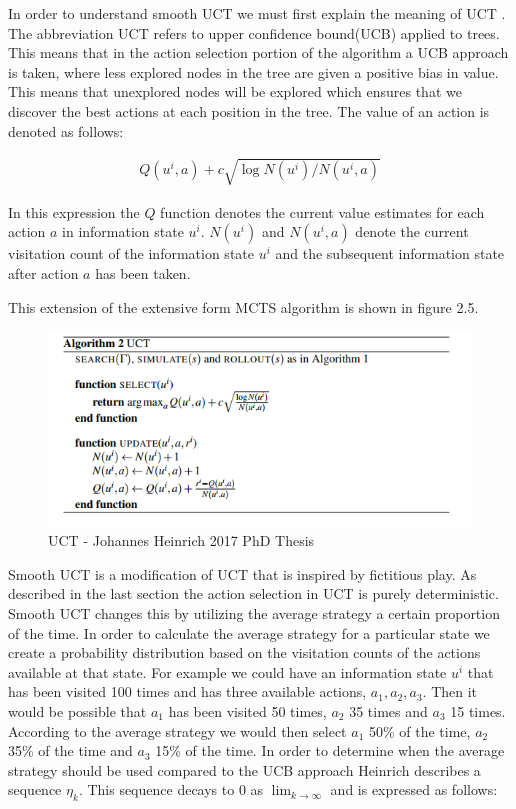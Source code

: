 In order to understand smooth UCT we must first explain the meaning of UCT .
The abbreviation UCT refers to upper confidence bound(UCB) applied to trees.
This means that in the action selection portion of the algorithm a UCB approach 
is taken, where less explored nodes in the tree are given a positive bias in value.
This means that unexplored nodes will be explored which ensures that we discover 
the best actions at each position in the tree.
The value of an action is denoted as follows:

\begin{align}
Q(u^i, a) + c \sqrt{\log N(u^i) / N(u^i, a)} 
\end{align}

In this expression the $Q$ function denotes the current value estimates for each action $a$ 
in information state $u^i$.
$N(u^i)$ and $N(u^i, a)$ denote the current visitation count of the information state $u^i$
and the subsequent information state after action $a$ has been taken.

This extension of the extensive form MCTS algorithm is shown in figure 2.5.

\begin{figure}[!ht]
    \includegraphics[scale=.6]{images/uct.png}
    \caption{UCT - Johannes Heinrich 2017 PhD Thesis}
\end{figure}

Smooth UCT is a modification of UCT that is inspired by fictitious play\citep{heinrich2017reinforcement}.
As described in the last section the action selection in UCT is purely deterministic.
Smooth UCT changes this by utilizing the average strategy a certain proportion of the time.
In order to calculate the average strategy for a particular state we create a 
probability distribution based on the visitation counts of the actions 
available at that state.
For example we could have an information state $u^i$ that has been visited 100 times 
and has three available actions, $a_1, a_2, a_3$.
Then it would be possible that $a_1$ has been visited 50 times, $a_2$ 35 times 
and $a_3$ 15 times.
According to the average strategy we would then select $a_1$ 50\% of the time, 
$a_2$ 35\% of the time and $a_3$ 15\% of the time.
In order to determine when the average strategy should be used compared to the 
UCB approach Heinrich describes a sequence $\eta_k$.
This sequence decays to 0 as $\lim_{k \to \infty}$ and is expressed as follows:

